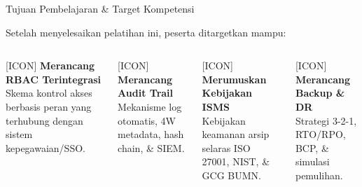 \documentclass[aspectratio=169,11pt]{beamer}
\begin{document}
\begin{frame}{Tujuan Pembelajaran \& Target Kompetensi}
    \vspace{0.2cm}
    \begin{premiumbox}
        \small
        Setelah menyelesaikan pelatihan ini, peserta ditargetkan mampu:
    \end{premiumbox}
    \vspace{0.3cm}
    \begin{columns}[T]
        [ICON] \textbf{Merancang RBAC Terintegrasi}\\
        \vspace{0.1cm}
        \small
        Skema kontrol akses berbasis peran yang terhubung dengan sistem kepegawaian/SSO.
        \vspace{0.3cm}
        
        [ICON] \textbf{Merancang Audit Trail}\\
        \vspace{0.1cm}
        \small
        Mekanisme log otomatis, 4W metadata, hash chain, \& SIEM.
        
        [ICON] \textbf{Merumuskan Kebijakan ISMS}\\
        \vspace{0.1cm}
        \small
        Kebijakan keamanan arsip selaras ISO 27001, NIST, \& GCG BUMN.
        \vspace{0.3cm}
        
        [ICON] \textbf{Merancang Backup \& DR}\\
        \vspace{0.1cm}
        \small
        Strategi 3-2-1, RTO/RPO, BCP, \& simulasi pemulihan.
    \end{columns}
\end{frame}
\end{document}
